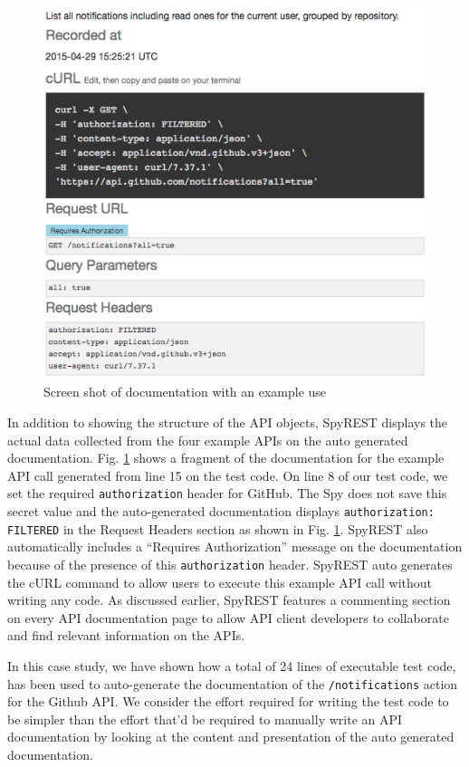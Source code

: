 \documentclass[conference]{IEEEtran}
\begin{document}
\begin{figure}[!tbh]
  \centering
  \includegraphics[width=\linewidth]{notification_example.png}
  \caption{Screen shot of documentation with an example use}
  \label{fig:notification_example}
\end{figure}

In addition to showing the structure of the API objects, SpyREST displays the actual data collected from the four example APIs on the auto generated documentation. Fig. \ref{fig:notification_example} shows a fragment of the documentation for the example API call generated from line 15 on the test code. On line 8 of our test code, we set the required \texttt{authorization} header for GitHub. The Spy does not save this secret value and the auto-generated documentation displays \texttt{authorization: FILTERED} in the Request Headers section as shown in Fig. \ref{fig:notification_example}. SpyREST also automatically includes a ``Requires Authorization'' message on the documentation because of the presence of this \texttt{authorization} header. SpyREST auto generates the cURL command to allow users to execute this example API call without writing any code. As discussed earlier, SpyREST features a commenting section on every API documentation page to allow API client developers to collaborate and find relevant information on the APIs.

In this case study, we have shown how a total of 24 lines of executable test code, has been used to auto-generate the documentation of the \texttt{/notifications} action for the Github API. We consider the effort required for writing the test code to be simpler than the effort that'd be required to manually write an API documentation by looking at the content and presentation of the auto generated documentation.
\end{document}
